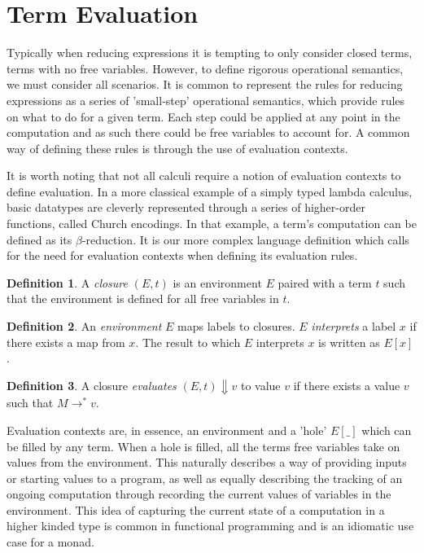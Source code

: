 \documentclass[12pt,a4paper]{report}
\theoremstyle{definition}
\newtheorem{definition}{Definition}[chapter]%
\theoremstyle{remark}
\begin{document}
\section{Term Evaluation}\label{section: evaluation}
Typically when reducing expressions it is tempting to only consider closed terms, terms with no free variables. However, to define rigorous operational semantics, we must consider all scenarios. It is common to represent the rules for reducing expressions as a series of 'small-step' operational semantics, which provide rules on what to do for a given term. Each step could be applied at any point in the computation and as such there could be free variables to account for. A common way of defining these rules is through the use of evaluation contexts.

It is worth noting that not all calculi require a notion of evaluation contexts to define evaluation. In a more classical example of a simply typed lambda calculus, basic datatypes are cleverly represented through a series of higher-order functions, called Church encodings. In that example, a term's computation can be defined as its $\beta$-reduction. It is our more complex language definition which calls for the need for evaluation contexts when defining its evaluation rules.

\begin{definition}
    A \emph{closure} $(E, t)$ is an environment $E$ paired with a term $t$ such that the environment is defined for all free variables in $t$.
\end{definition}

\begin{definition}\label{def: environment}
    An \emph{environment} $E$ maps labels to closures. $E$ \emph{interprets} a label $x$ if there exists a map from $x$. The result to which $E$ interprets $x$ is written as $E[x]$.
\end{definition}

\begin{definition}
    A closure \emph{evaluates} $(E, t) \Downarrow v$ to value $v$ if there exists a value $v$ such that $M \rightarrow^* v$.
\end{definition}

Evaluation contexts are, in essence, an environment and a 'hole' $E[\_]$ which can be filled by any term. When a hole is filled, all the terms free variables take on values from the environment. This naturally describes a way of providing inputs or starting values to a program, as well as equally describing the tracking of an ongoing computation through recording the current values of variables in the environment. This idea of capturing the current state of a computation in a higher kinded type is common in functional programming and is an idiomatic use case for a monad.
\end{document}
